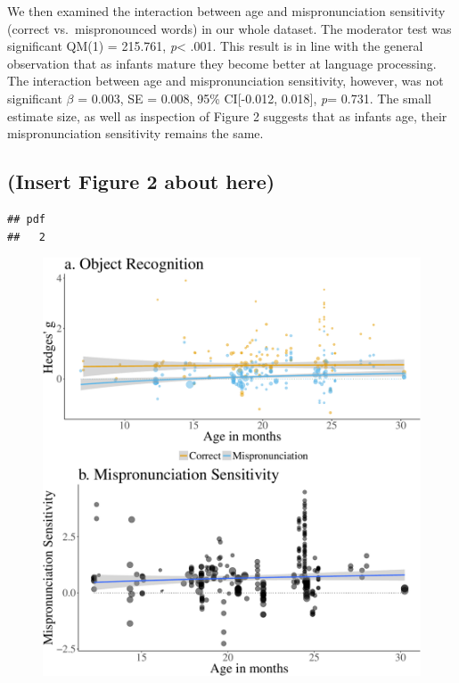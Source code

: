\documentclass[man]{apa6}
\theoremstyle{definition}
\theoremstyle{definition}
\theoremstyle{definition}
\theoremstyle{remark}
\begin{document}
We then examined the interaction between age and mispronunciation
sensitivity (correct vs.~mispronounced words) in our whole dataset. The
moderator test was significant QM(1) = 215.761, \emph{p}\textless{}
.001. This result is in line with the general observation that as
infants mature they become better at language processing. The
interaction between age and mispronunciation sensitivity, however, was
not significant \(\beta\) = 0.003, SE = 0.008, 95\% CI{[}-0.012,
0.018{]}, \emph{p}= 0.731. The small estimate size, as well as
inspection of Figure 2 suggests that as infants age, their
mispronunciation sensitivity remains the same.

\subsection{(Insert Figure 2 about
here)}\label{insert-figure-2-about-here}

\begin{verbatim}
## pdf 
##   2
\end{verbatim}

\begin{figure}[htbp]
\centering
\includegraphics{Paper_Analyses_files/figure-latex/PlotMPEffect-1.pdf}
\caption{}
\end{figure}
\end{document}
